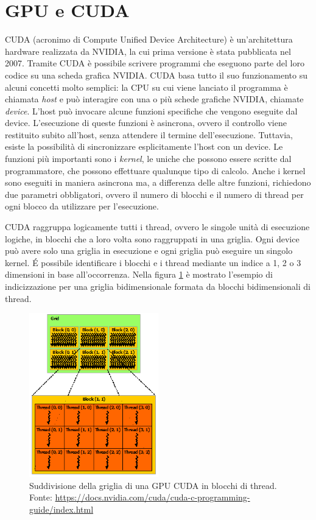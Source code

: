 \documentclass[12pt,a4paper,oneside]{book}
\begin{document}
	\section{GPU e CUDA}
	CUDA (acronimo di Compute Unified Device Architecture) è un'architettura hardware realizzata da NVIDIA, la cui prima versione è stata pubblicata nel 2007. Tramite CUDA è possibile scrivere programmi che eseguono parte del loro codice su una scheda grafica NVIDIA. CUDA basa tutto il suo funzionamento su alcuni concetti molto semplici: la CPU su cui viene lanciato il programma è chiamata \textit{host} e può interagire con una o più schede grafiche NVIDIA, chiamate \textit{device}. L'host può invocare alcune funzioni specifiche che vengono eseguite dal device. L'esecuzione di queste funzioni è asincrona, ovvero il controllo viene restituito subito all'host, senza attendere il termine dell'esecuzione. Tuttavia, esiste la possibilità di sincronizzare esplicitamente l'host con un device. Le funzioni più importanti sono i \textit{kernel}, le uniche che possono essere scritte dal programmatore, che possono effettuare qualunque tipo di calcolo. Anche i kernel sono eseguiti in maniera asincrona ma, a differenza delle altre funzioni, richiedono due parametri obbligatori, ovvero il numero di blocchi e il numero di thread per ogni blocco da utilizzare per l'esecuzione.
	
	CUDA raggruppa logicamente tutti i thread, ovvero le singole unità di esecuzione logiche, in blocchi che a loro volta sono raggruppati in una griglia. Ogni device può avere solo una griglia in esecuzione e ogni griglia può eseguire un singolo kernel. \'E possibile identificare i blocchi e i thread mediante un indice a 1, 2 o 3 dimensioni in base all'occorrenza. Nella figura \ref{fig:grid-of-thread-blocks} è mostrato l'esempio di indicizzazione per una griglia bidimensionale formata da blocchi bidimensionali di thread.
	
	\begin{figure}[!ht]
		\centering
		\includegraphics[width=0.5\textwidth]{grid-of-thread-blocks}
		\caption[Struttura della griglia di una GPU CUDA]{Suddivisione della griglia di una GPU CUDA in blocchi di thread. Fonte: \url{https://docs.nvidia.com/cuda/cuda-c-programming-guide/index.html}}
		\label{fig:grid-of-thread-blocks}
	\end{figure}
	
\end{document}
